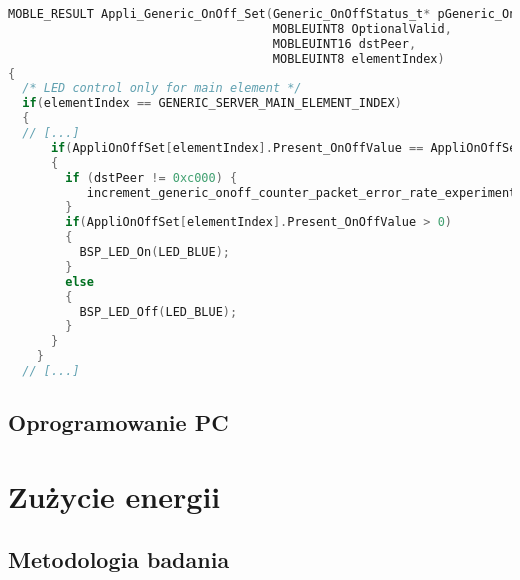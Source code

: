 \begin{lstlisting}[language=C,
    caption={Testowy kod C},
    label={lst:kod cpp}]
MOBLE_RESULT Appli_Generic_OnOff_Set(Generic_OnOffStatus_t* pGeneric_OnOffParam, 
                                     MOBLEUINT8 OptionalValid,
                                     MOBLEUINT16 dstPeer,
                                     MOBLEUINT8 elementIndex)
{
  /* LED control only for main element */
  if(elementIndex == GENERIC_SERVER_MAIN_ELEMENT_INDEX)
  {
  // [...]
      if(AppliOnOffSet[elementIndex].Present_OnOffValue == AppliOnOffSet[elementIndex].TargetValue)
      {
    	if (dstPeer != 0xc000) {
    	   increment_generic_onoff_counter_packet_error_rate_experiment(AppliOnOffSet[elementIndex].Present_OnOffValue, dstPeer);
    	}
        if(AppliOnOffSet[elementIndex].Present_OnOffValue > 0)
        {
          BSP_LED_On(LED_BLUE);
        }
        else
        {
          BSP_LED_Off(LED_BLUE);
        }
      }
    }  
  // [...]
\end{lstlisting}

\subsection{Oprogramowanie PC} \label{prep:pc-software}


\section{Zużycie energii}

\subsection{Metodologia badania}

\lipsum[1-3]
